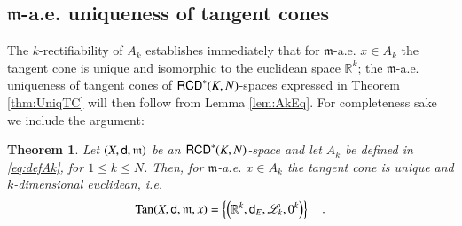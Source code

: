 \documentclass[11pt,reqno]{amsart}
\newcommand{\mm}{\mathfrak m}
\newcommand{\sfd}{{\sf d}}
\newcommand{\LL}{\mathscr{L}}
\newcommand{\R}{\mathbb{R}}
\newcommand{\Tan}{{\rm Tan}}
\newcommand{\RCD}{{\sf RCD}}
\newtheorem{theorem}{Theorem}[section]
\theoremstyle{definition}
\theoremstyle{remark}
\theoremstyle{remark}
\theoremstyle{remark}
\theoremstyle{remark}
\theoremstyle{remark}
\theoremstyle{remark}
\theoremstyle{remark}
\begin{document}
\subsection{$\mm$-a.e. uniqueness of tangent cones}\label{SS:UniqTC}

The $k$-rectifiability of $A_k$ establishes immediately that for $\mm$-a.e. $x \in A_k$ the tangent cone is unique and isomorphic to the euclidean space $\R^k$; the $\mm$-a.e. uniqueness of tangent cones of $\RCD^*(K,N)$-spaces expressed in Theorem \ref{thm:UniqTC} will then follow from Lemma \ref{lem:AkEq}. For completeness sake we include the argument:
  
 \begin{theorem}
 Let $(X,\sfd,\mm)$ be an $\RCD^*(K,N)$-space and let $A_k$ be defined in \eqref{eq:defAk}, for  $1\leq k \leq N$. Then, for $\mm$-a.e. $x \in A_k$ the tangent cone is unique and $k$-dimensional euclidean, i.e.
 \begin{equation}
 \Tan(X, \sfd, \mm, x) = \left\{ \left(\R^k, \sfd_E, \LL_k, 0^k\right) \right\} \quad.
 \end{equation}  
 \end{theorem}
 
\end{document}
